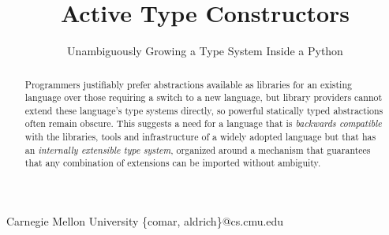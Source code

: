 \documentclass[9pt,preprint]{sigplanconf}
\begin{document}
\conferenceinfo{-}{-} 
\copyrightyear{-} 
\copyrightdata{[to be supplied]} 

\title{Active Type Constructors}
\subtitle{Unambiguously Growing a Type System Inside a Python}


          {          Carnegie Mellon University}
          {\{comar, aldrich\}@cs.cmu.edu}   

\maketitle
\begin{abstract}
%
Programmers justifiably prefer abstractions available as libraries for an existing language over those requiring a switch to a new language, but library providers cannot extend these language's type systems directly, so powerful statically typed abstractions often remain obscure. This suggests a need for a language that is \emph{backwards compatible} with the libraries, tools and infrastructure of a widely adopted language but that has an  \emph{internally extensible type system}, organized around a mechanism that guarantees that any combination of extensions can be imported  without  ambiguity. 


\end{abstract}
\end{document}
